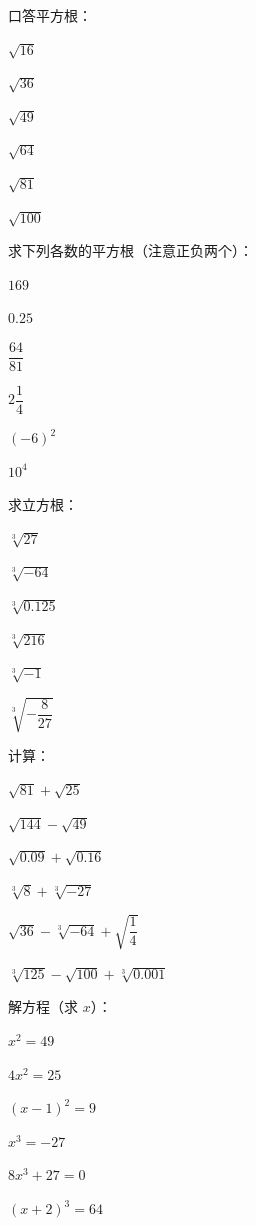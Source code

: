 \begin{exercise}
\item 口答平方根：
  \begin{subexercise}
    \item $\sqrt{16}$
    \item $\sqrt{36}$
    \item $\sqrt{49}$
    \item $\sqrt{64}$
    \item $\sqrt{81}$
    \item $\sqrt{100}$
  \end{subexercise}

\item 求下列各数的平方根（注意正负两个）：
  \begin{subexercise}
    \item $169$
    \item $0.25$
    \item $\dfrac{64}{81}$
    \item $2\dfrac{1}{4}$
    \item $(-6)^2$
    \item $10^4$
  \end{subexercise}

\item 求立方根：
  \begin{subexercise}
    \item $\sqrt[3]{27}$
    \item $\sqrt[3]{-64}$
    \item $\sqrt[3]{0.125}$
    \item $\sqrt[3]{216}$
    \item $\sqrt[3]{-1}$
    \item $\sqrt[3]{-\dfrac{8}{27}}$
  \end{subexercise}

\item 计算：
  \begin{subexercise}
    \item $\sqrt{81}+\sqrt{25}$
    \item $\sqrt{144}-\sqrt{49}$
    \item $\sqrt{0.09}+\sqrt{0.16}$
    \item $\sqrt[3]{8}+\sqrt[3]{-27}$
    \item $\sqrt{36}-\sqrt[3]{-64}+\sqrt{\dfrac{1}{4}}$
    \item $\sqrt[3]{125}-\sqrt{100}+\sqrt[3]{0.001}$
  \end{subexercise}

\item 解方程（求 $x$）：
  \begin{subexercise}
    \item $x^2=49$
    \item $4x^2=25$
    \item $(x-1)^2=9$
    \item $x^3=-27$
    \item $8x^3+27=0$
    \item $(x+2)^3=64$
  \end{subexercise}
\end{exercise}

